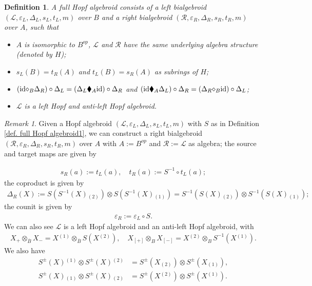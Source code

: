 \documentclass[a4paper,reqno]{amsart}
\newcommand*{\id}{\textup{id}}
\numberwithin{equation}{section}
\theoremstyle{plain}
\newtheorem{defi}[thm]{Definition}
\theoremstyle{remark}
\newtheorem{rem}[thm]{Remark}
\numberwithin{equation}{section}
\newcommand{\ot}{\otimes}
\newcommand{\cL}{\mathcal{L}}
\newcommand{\cR}{\mathcal{R}}
\newcommand{\BB}{\overline{B}}
\newcommand{\teins}[1]{{#1}{}{}^{\scriptscriptstyle{(1)}}}
\newcommand{\tzwei}[1]{{#1}{}{}^{\scriptscriptstyle{(2)}}}
\renewcommand{\o}{{}_{\scriptscriptstyle{(1)}}}
\renewcommand{\t}{{}_{\scriptscriptstyle{(2)}}}
\newcommand{\di}{{\diamond_{B}}}
\begin{document}
\begin{defi}\label{def. full Hopf algebroid2}
    A full Hopf algebroid consists of a left bialgebroid $(\cL, \varepsilon_{L}, \Delta_{L}, s_{L}, t_{L}, m)$ over $B$ and a right bialgebroid $(\cR, \varepsilon_{R}, \Delta_{R}, s_{R}, t_{R}, m)$ over $A$, such that 
    \begin{itemize}
        \item [(i)] $A$ is isomorphic to $B^{op}$,  $\cL$ and $\cR$ have the same underlying algebra structure (denoted by $H$);
        \item [(ii)] $s_{L}(B)=t_{R}(A)$ and $t_{L}(B)=s_{R}(A)$ as subrings of $H$;
        \item [(iii)] $(\id\di\Delta_{R})\circ\Delta_{L}=(\Delta_{L}\blacklozenge_{A}\id)\circ\Delta_{R}$ and $(\id\blacklozenge_{A}\Delta_{L})\circ\Delta_{R}=(\Delta_{R}\di\id)\circ\Delta_{L}$;
        \item [(iv)] $\cL$ is a left Hopf and anti-left Hopf algebroid. 
    \end{itemize}
\end{defi}
\begin{rem}
Given a Hopf algebroid  $(\cL, \varepsilon_{L}, \Delta_{L}, s_{L}, t_{L}, m)$ with $S$ as in Definition \ref{def. full Hopf algebroid1}, we can construct a right bialgebroid $(\cR, \varepsilon_{R}, \Delta_{R}, s_{R}, t_{R}, m)$ over $A$ with $A:=B^{op}$ and $\cR:=\cL$ as algebra; the source and target maps are given by

\begin{align}\label{equ. left source target maps to right source and target maps}
  s_{R}(a):=t_{L}(a), \quad t_{R}(a):=S^{-1}\circ t_{L}(a);  
\end{align}
the coproduct is given by
\begin{align}\label{equ. left coproduct to right coproduct}
    \Delta_{R}(X):=S(S^{-1}(X)\t)\ot S(S^{-1}(X)\o)=S^{-1}(S(X)\t)\ot S^{-1}(S(X)\o);
\end{align}
the counit is given by
\begin{align}\label{equ. left counit to right counit}
\varepsilon_{R}:=\varepsilon_{L}\circ S.
\end{align}
We can also see $\cL$ is a left Hopf algebroid and an anti-left Hopf algebroid, with 
\begin{align}\label{equ. Galois map of full Hopf}   X_{+}\ot_{\BB}X_{-}=X\teins{}\ot_{\BB}S(X\tzwei{}),\quad X_{[+]}\ot_{B}X_{[-]}=X\tzwei{}\ot_{B}S^{-1}(X\teins{}).
\end{align}
We also have
\begin{align}\label{equ. anti-colinear}
    S^{\pm}(X)\teins{}\ot S^{\pm}(X)\tzwei{}&=S^{\pm}(X\t)\ot S^{\pm}(X\o),\\
    S^{\pm}(X)\o\ot S^{\pm}(X)\t&=S^{\pm}(X\tzwei{})\ot S^{\pm}(X\teins{}).
\end{align}
\end{rem}
\end{document}
